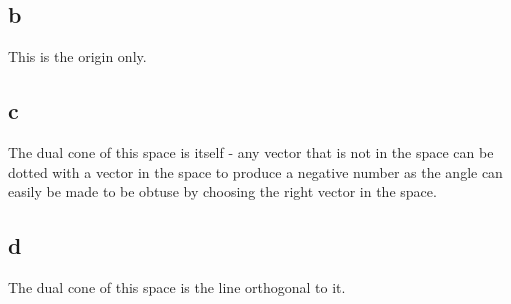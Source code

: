 \documentclass{article}
\begin{document}
\subsection*{b} This is the origin only.
\subsection*{c} The dual cone of this space is itself - any vector that is not in the space can be dotted with a vector in the space to produce a negative number as the angle can easily be made to be obtuse by choosing the right vector in the space.
\subsection*{d} The dual cone of this space is the line orthogonal to it.
\end{document}
